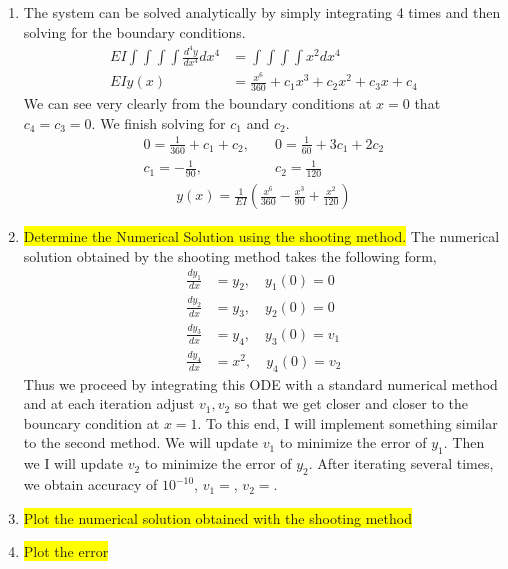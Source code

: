 \documentclass{article}
\begin{document}
\begin{enumerate}[label=\alph*)]

  \item The system can be solved analytically by simply integrating 4 times and
  then solving for the boundary conditions. 
  \begin{align*}
    EI\int\int\int\int \frac{d^4y}{dx^4} dx^4 &= \int\int\int\int x^2 dx^4\\
    EIy(x) &= \frac{x^6}{360} + c_1x^3 + c_2x^2 + c_3x + c_4
  \end{align*}
  We can see very clearly from the boundary conditions at $x=0$ that $c_4=c_3=0$.
  We finish solving for $c_1$ and $c_2$.
  \begin{align*}
    0 = \frac{1}{360} + c_1 + c_2, &\quad 0 = \frac{1}{60} + 3c_1 + 2c_2\\
    c_1 = -\frac{1}{90}, &\quad c_2 = \frac{1}{120}
  \end{align*}
  \begin{align*}
    y(x) = \frac{1}{EI}\left(\frac{x^6}{360} - \frac{x^3}{90} +
    \frac{x^2}{120}\right)
  \end{align*}

  \item \colorbox{yellow}{Determine the Numerical Solution using the shooting method.}
  The numerical solution obtained by the shooting method takes the following
  form,
  \begin{align*}
    \frac{dy_1}{dx} &= y_2, \quad y_1(0) = 0\\
    \frac{dy_2}{dx} &= y_3, \quad y_2(0) = 0\\
    \frac{dy_3}{dx} &= y_4, \quad y_3(0) = v_1\\
    \frac{dy_4}{dx} &= x^2, \quad y_4(0) = v_2
  \end{align*}
  Thus we proceed by integrating this ODE with a standard numerical method and
  at each iteration adjust $v_1, v_2$ so that we get closer and closer to the bouncary
  condition at $x=1$. To this end, I will implement something similar to the
  second method. We will update $v_1$ to minimize the error of $y_1$. Then we I
  will update $v_2$ to minimize the error of $y_2$. After iterating several
  times, we obtain accuracy of $10^{-10}$, $v_1 = $, $v_2 = $. 


  \item \colorbox{yellow}{Plot the numerical solution obtained with the shooting
  method}

  \item \colorbox{yellow}{Plot the error}

\end{enumerate}
\end{document}
